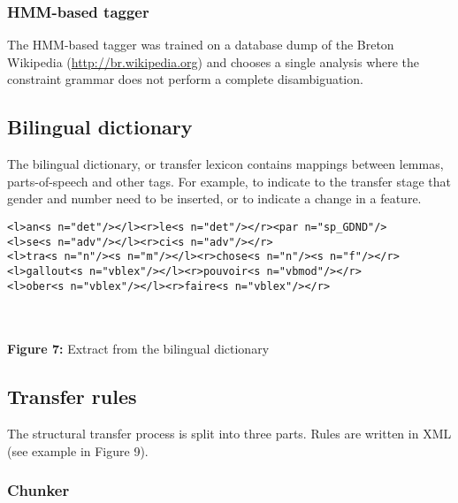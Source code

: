 \documentclass[a0,landscape]{a0poster}
\begin{document}
\begin{multicols}{4}
\subsubsection{HMM-based tagger}

\noindent
The HMM-based tagger was trained on a database dump of the Breton Wikipedia (\url{http://br.wikipedia.org}) and
chooses a single analysis where the constraint grammar does not perform a complete disambiguation.\\

\subsection{Bilingual dictionary}

\noindent
The bilingual dictionary, or transfer lexicon contains mappings between lemmas,
parts-of-speech and other tags. For example, to indicate to the transfer stage
that gender and number need to be inserted, or to indicate a change in a feature.\\

\begin{center}
\begin{minipage}[b]{26cm}
\begin{small}
\begin{verbatim}
<l>an<s n="det"/></l><r>le<s n="det"/></r><par n="sp_GDND"/>
<l>se<s n="adv"/></l><r>ci<s n="adv"/></r>
<l>tra<s n="n"/><s n="m"/></l><r>chose<s n="n"/><s n="f"/></r>
<l>gallout<s n="vblex"/></l><r>pouvoir<s n="vbmod"/></r>
<l>ober<s n="vblex"/></l><r>faire<s n="vblex"/></r>
\end{verbatim}
\end{small}
\end{minipage}\\
~\\
\textbf{Figure 7:} Extract from the bilingual dictionary
\vspace{0.3cm}
\end{center}

\subsection{Transfer rules}

\noindent
The structural transfer process is split into three parts. Rules are written in XML (see example in Figure 9).

\subsubsection{Chunker}


\end{multicols}
\end{document}
